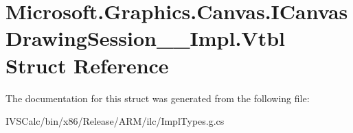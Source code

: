 \hypertarget{struct_microsoft_1_1_graphics_1_1_canvas_1_1_i_canvas_drawing_session_____impl_1_1_vtbl}{}\section{Microsoft.\+Graphics.\+Canvas.\+I\+Canvas\+Drawing\+Session\+\_\+\+\_\+\+Impl.\+Vtbl Struct Reference}
\label{struct_microsoft_1_1_graphics_1_1_canvas_1_1_i_canvas_drawing_session_____impl_1_1_vtbl}


The documentation for this struct was generated from the following file\+:\begin{DoxyCompactItemize}
\item 
I\+V\+S\+Calc/bin/x86/\+Release/\+A\+R\+M/ilc/Impl\+Types.\+g.\+cs\end{DoxyCompactItemize}
